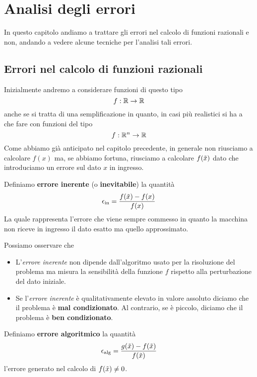 \chapter{Analisi degli errori}
In questo capitolo andiamo a trattare gli errori nel calcolo di funzioni razionali e non, andando a vedere
alcune tecniche per l'analisi tali errori.

\section{Errori nel calcolo di funzioni razionali}
Inizialmente andremo a considerare funzioni di questo tipo
\[ f : \mathbb{R} \to \mathbb{R}\]
anche se si tratta di una semplificazione in quanto, in casi più realistici si ha a che fare con funzioni del tipo
\[ f : \mathbb{R}^n \to \mathbb{R} \]
Come abbiamo già anticipato nel capitolo precedente, in generale non riusciamo a calcolare $f(x)$ ma, se abbiamo
fortuna, riusciamo a calcolare $f(\tilde{x})$ dato che introduciamo un errore sul dato $x$ in ingresso.

\begin{definition}\label{def: errore_inerente}
	Definiamo \textbf{errore inerente} (o \textbf{inevitabile}) la quantità
	\[ \epsilon_{\text{in}} = \frac{f(\tilde{x}) - f(x)}{f(x)} \]
	La quale rappresenta l'errore che viene sempre commesso in quanto la macchina non riceve in ingresso
	il dato esatto ma quello approssimato.
\end{definition}

\begin{observation}
	Possiamo osservare che
	\begin{itemize}
		\item L'\emph{errore inerente} non dipende dall'algoritmo usato per la risoluzione del problema ma
		      misura la sensibilità della funzione $f$ rispetto alla perturbazione del dato iniziale.
		\item Se l'\emph{errore inerente} è qualitativamente elevato in valore assoluto diciamo che il problema
		      è \textbf{mal condizionato}. Al contrario, se è piccolo, diciamo che il problema è
		      \textbf{ben condizionato}.
	\end{itemize}
\end{observation}

\begin{definition}\label{def: errore_algoritmico}
	Definiamo \textbf{errore algoritmico} la quantità
	\[ \epsilon_{\text{alg}} = \frac{g(\tilde{x}) - f(\tilde{x})}{f(\tilde{x})} \]
	l'errore generato nel calcolo di $f(\tilde{x}) \neq 0$.
\end{definition}

